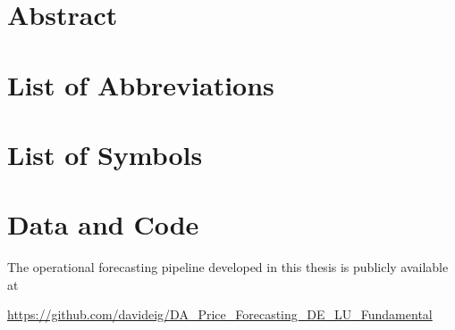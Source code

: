 \documentclass[
  paper=a4,
  fontsize=10pt,
  toc=bib,
  titlepage=firstiscover,
  headings=big
]{scrartcl}
\theoremstyle{definition}
\begin{document}

\section*{Abstract}


\clearpage
\tableofcontents
\clearpage
{}
{}
\listoftables
\clearpage
{}
{}
\listoffigures
\clearpage
{}
{}
\section*{List of Abbreviations}

\clearpage
{}
{}
\section*{List of Symbols}

\clearpage

\pagestyle{headings}



\clearpage

\clearpage

\clearpage

\clearpage

\clearpage

\clearpage



\clearpage
\thispagestyle{plain}
\markboth{}{}
\section*{Data and Code}

The operational forecasting pipeline developed in this thesis is publicly
available at

\begin{center}
\url{https://github.com/davideig/DA_Price_Forecasting_DE_LU_Fundamental}
\end{center}
\end{document}
